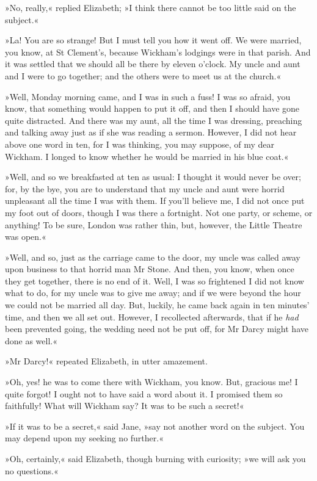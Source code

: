 »No, really,« replied Elizabeth; »I think there cannot be too little said on the subject.«

»La! You are so strange! But I must tell you how it went off. We were married, you know, at St Clement's, because Wickham's lodgings were in that parish. And it was settled that we should all be there by eleven o'clock. My uncle and aunt and I were to go together; and the others were to meet us at the church.«

»Well, Monday morning came, and I was in such a fuss! I was so afraid, you know, that something would happen to put it off, and then I should have gone quite distracted. And there was my aunt, all the time I was dressing, preaching and talking away just as if she was reading a sermon. However, I did not hear above one word in ten, for I was thinking, you may suppose, of my dear Wickham. I longed to know whether he would be married in his blue coat.«

»Well, and so we breakfasted at ten as usual: I thought it would never be over; for, by the bye, you are to understand that my uncle and aunt were horrid unpleasant all the time I was with them. If you'll believe me, I did not once put my foot out of doors, though I was there a fortnight. Not one party, or scheme, or anything! To be sure, London was rather thin, but, however, the Little Theatre was open.«

»Well, and so, just as the carriage came to the door, my uncle was called away upon business to that horrid man Mr Stone. And then, you know, when once they get together, there is no end of it. Well, I was so frightened I did not know what to do, for my uncle was to give me away; and if we were beyond the hour we could not be married all day. But, luckily, he came back again in ten minutes' time, and then we all set out. However, I recollected afterwards, that if he \textit{had} been prevented going, the wedding need not be put off, for Mr Darcy might have done as well.«

»Mr Darcy!« repeated Elizabeth, in utter amazement.

»Oh, yes! he was to come there with Wickham, you know. But, gracious me! I quite forgot! I ought not to have said a word about it. I promised them so faithfully! What will Wickham say? It was to be such a secret!«

»If it was to be a secret,« said Jane, »say not another word on the subject. You may depend upon my seeking no further.«

»Oh, certainly,« said Elizabeth, though burning with curiosity; »we will ask you no questions.«

